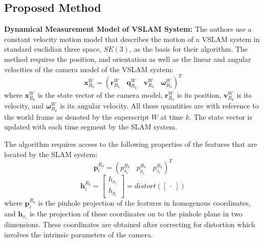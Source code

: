 \documentclass[10pt,twocolumn,letterpaper]{article}
\begin{document}
\subsection{Proposed Method}
\textbf{Dynamical Measurement Model of VSLAM System:}
The authors use a constant velocity motion model that describes the motion of a VSLAM system in standard 
euclidian three space, 
$SE(3)$, as the basis for their algorithm. The method requires the position, and orientation as well as the linear 
and angular velocities 
of the camera model of the VSLAM system: 
\begin{equation} \label{eq:stateVector}
\boldsymbol{x}_{R_k}^W = (\boldsymbol{r}_{R_k}^W \ \ \ \  \boldsymbol{q}_{R_k}^W  \ \ \ \  \boldsymbol{v}_{R_k}^W  \ \ \ \  \boldsymbol{\omega}_{R_k}^W)^T
\end{equation}
where $\boldsymbol{x}_{R_k}^W$ is the state vector of the camera model, 
$\boldsymbol{r}_{R_k}^W$ is its position, 
$\boldsymbol{v}_{R_k}^W$ is its velocity, 
and $\boldsymbol{\omega}_{R_k}^W$ is its angular velocity. All these quantities are with reference to the world frame as denoted by the superscript $W$ at time $k$. 
The state vector is updated with each time segment by the SLAM system. 

The algorithm requires access to the following properties of the features that are located by the SLAM system: 
\begin{equation} \label{eq:featureProjection}
\boldsymbol{p}_{i}^{R_k} = ({p}_{x_i}^{R_k} \ \ \ \  {p}_{y_i}^{R_k}  \ \ \ \  {p}_{z_i}^{R_k})^T
\end{equation}
\begin{equation} \label{eq:featureProjection2}
\boldsymbol{h}_{i}^{R_k} = \begin{bmatrix} {h}_{x_i} \\ {h}_{y_i} \end{bmatrix} = distort(\begin{bmatrix} . \end{bmatrix})
\end{equation}
where $\boldsymbol{p}_{i}^{R_k}$ is the pinhole projection of the features in homogenous coordinates, and 
$\boldsymbol{h}_{x_i}$ is the projection of these coordinates on to the pinhole plane in two dimensions. 
These coordinates are obtained after correcting for distortion which involves the intrinsic parameters of the
 camera.
\end{document}
